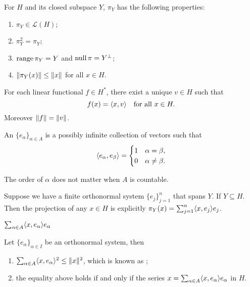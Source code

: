 \begin{prop}
    For $H$ and its closed subspace $Y$, $\pi_Y$ has the following properties:
    \begin{enumerate}
        \item $\pi_Y \in \mathcal{L}(H)$;
        \item $\pi_Y^2 =\pi_Y$;
        \item $\operatorname{range} \pi_Y = Y$ and $\operatorname{null} \pi = Y^\perp$;
        \item $\lVert \pi_Y(x) \rVert \leq \lVert x \rVert$ for all $x \in H$.
    \end{enumerate}
\end{prop}

\begin{namedthm}
    For each linear functional $f \in H^*$, there exist a unique $v \in H$ such that \[
        f(x) = \langle x, v \rangle\quad\text{for all }x\in H.
    \] Moreover $\lVert f \rVert = \lVert v \rVert$.
\end{namedthm}

An  $\{e_\alpha\}_{\alpha \in A}$ is a possibly infinite collection of vectors such that \[\langle e_\alpha, e_\beta \rangle = \begin{cases}
    1 & \alpha = \beta, \\
    0 & \alpha \neq \beta.\end{cases}
\]

The order of $\alpha$ does not matter when $A$ is countable.

\begin{prop}
    Suppose we have a finite orthonormal system $\{e_j\}_{j=1}^n$ that spans $Y$. If $Y \subseteq H$. Then the projection of any $x\in H$ is explicitly $\pi_Y(x) = \sum_{j=1}^n \langle x, e_j \rangle e_j$.
\end{prop}

\begin{prop}
    $\sum_{\alpha \in A}\langle x, e_\alpha \rangle e_\alpha$ 
\end{prop}

\begin{thm}
Let $\{e_\alpha\}_{\alpha\in I}$ be an orthonormal system, then \begin{enumerate}
    \item $\sum_{\alpha \in A} \langle x, e_\alpha \rangle^2 \leq \lVert x \rVert^2$, which is known as ;
    \item the equality above holds if and only if the series $x = \sum_{\alpha \in A}\langle x, e_\alpha \rangle e_\alpha$ in $H$.
\end{enumerate}
\end{thm}

